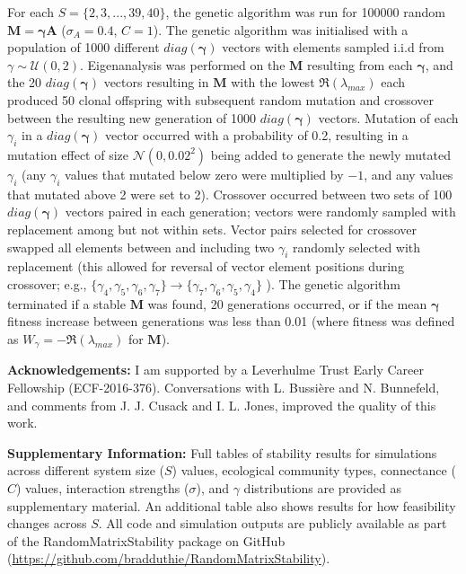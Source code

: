 \documentclass[]{article}
\begin{document}
For each \(S = \{2, 3, ..., 39, 40\}\), the genetic algorithm was run
for 100000 random \(\mathbf{M = \gamma A}\) (\(\sigma_{A} = 0.4\),
\(C = 1\)). The genetic algorithm was initialised with a population of
1000 different \(diag(\boldsymbol{\gamma})\) vectors with elements
sampled i.i.d from \(\gamma \sim \mathcal{U}(0, 2)\). Eigenanalysis was
performed on the \(\mathbf{M}\) resulting from each
\(\boldsymbol{\gamma}\), and the 20 \(diag(\boldsymbol{\gamma})\)
vectors resulting in \(\mathbf{M}\) with the lowest
\(\Re(\lambda_{max})\) each produced 50 clonal offspring with subsequent
random mutation and crossover between the resulting new generation of
1000 \(diag(\boldsymbol{\gamma})\) vectors. Mutation of each
\(\gamma_{i}\) in a \(diag(\boldsymbol{\gamma})\) vector occurred with a
probability of 0.2, resulting in a mutation effect of size
\(\mathcal{N}(0, 0.02^{2})\) being added to generate the newly mutated
\(\gamma_{i}\) (any \(\gamma_{i}\) values that mutated below zero were
multiplied by \(-1\), and any values that mutated above 2 were set to
2). Crossover occurred between two sets of 100
\(diag(\boldsymbol{\gamma})\) vectors paired in each generation; vectors
were randomly sampled with replacement among but not within sets. Vector
pairs selected for crossover swapped all elements between and including
two \(\gamma_{i}\) randomly selected with replacement (this allowed for
reversal of vector element positions during crossover; e.g.,
\(\{\gamma_{4}, \gamma_{5}, \gamma_{6}, \gamma_{7}\} \to \{\gamma_{7}, \gamma_{6}, \gamma_{5}, \gamma_{4}\}\)
). The genetic algorithm terminated if a stable \(\mathbf{M}\) was
found, 20 generations occurred, or if the mean \(\boldsymbol{\gamma}\)
fitness increase between generations was less than 0.01 (where fitness
was defined as \(W_{\gamma} = -\Re(\lambda_{max})\) for \(\mathbf{M}\)).

\textbf{Acknowledgements:} I am supported by a Leverhulme Trust Early
Career Fellowship (ECF-2016-376). Conversations with L. Bussière and N.
Bunnefeld, and comments from J. J. Cusack and I. L. Jones, improved the
quality of this work.

\textbf{Supplementary Information:} Full tables of stability results for
simulations across different system size (\(S\)) values, ecological
community types, connectance (\(C\)) values, interaction strengths
(\(\sigma\)), and \(\gamma\) distributions are provided as supplementary
material. An additional table also shows results for how feasibility
changes across \(S\). All code and simulation outputs are publicly
available as part of the RandomMatrixStability package on GitHub
(\url{https://github.com/bradduthie/RandomMatrixStability}).
\end{document}
